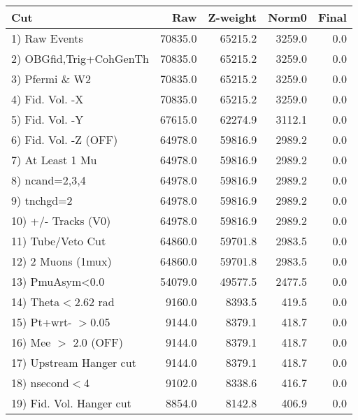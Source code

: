 \begin{table}[h!]\centering
 \begin{tabular}{||l||r|r|r|r||}
 \hline
 \hline
 Cut & Raw & Z-weight & Norm0 & Final \\
 \hline
  1) Raw Events           &     70835.0 &     65215.2 &      3259.0 &         0.0 \\
  2) OBGfid,Trig+CohGenTh &     70835.0 &     65215.2 &      3259.0 &         0.0 \\
  3) Pfermi \& W2         &     70835.0 &     65215.2 &      3259.0 &         0.0 \\
  4) Fid. Vol. -X         &     70835.0 &     65215.2 &      3259.0 &         0.0 \\
  5) Fid. Vol. -Y         &     67615.0 &     62274.9 &      3112.1 &         0.0 \\
  6) Fid. Vol. -Z (OFF)   &     64978.0 &     59816.9 &      2989.2 &         0.0 \\
  7) At Least 1 Mu        &     64978.0 &     59816.9 &      2989.2 &         0.0 \\
  8) ncand=2,3,4          &     64978.0 &     59816.9 &      2989.2 &         0.0 \\
  9) tnchgd=2             &     64978.0 &     59816.9 &      2989.2 &         0.0 \\
 10) +/- Tracks (V0)      &     64978.0 &     59816.9 &      2989.2 &         0.0 \\
 11) Tube/Veto Cut        &     64860.0 &     59701.8 &      2983.5 &         0.0 \\
 12) 2 Muons (1mux)       &     64860.0 &     59701.8 &      2983.5 &         0.0 \\
 13) PmuAsym<0.0          &     54079.0 &     49577.5 &      2477.5 &         0.0 \\
 14) Theta$<$2.62 rad     &      9160.0 &      8393.5 &       419.5 &         0.0 \\
 15) Pt+wrt- $>$0.05      &      9144.0 &      8379.1 &       418.7 &         0.0 \\
 16) Mee $>$ 2.0  (OFF)   &      9144.0 &      8379.1 &       418.7 &         0.0 \\
 17) Upstream Hanger cut  &      9144.0 &      8379.1 &       418.7 &         0.0 \\
 18) nsecond$<$4          &      9102.0 &      8338.6 &       416.7 &         0.0 \\
 19) Fid. Vol. Hanger cut &      8854.0 &      8142.8 &       406.9 &         0.0 \\

\end{tabular}
\end{table}
